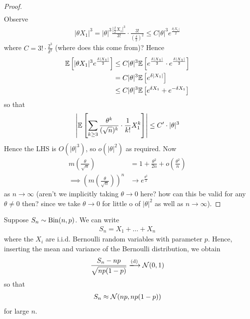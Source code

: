\documentclass{../../template/note}
\begin{document}
\begin{proof}
\begin{align*}
        \end{align*}
        Observe
        \begin{align*}
            |\theta X_1|^3 = |\theta|^3 \frac{\left|\frac{\delta}2 X_1\right|^3}{3!} \cdot \frac{3!}{\left(\frac{\delta}2\right)^2} \leq C|\theta|^3 e^{\frac{\delta|X_1|}{2}}
        \end{align*}
        where \(C = 3! \cdot \frac{2^3}{\delta^3}\) (where does this come from)? Hence
        \begin{align*}
            \mathbb E\left[|\theta X_1|^3 e^{\frac{\delta|X_1|}{2}}\right] &\leq C|\theta|^3 \mathbb E\left[e^{\frac{\delta|X_1|}{2}} \cdot e^{\frac{\delta|X_1|}{2}}\right] \\
            &= C|\theta|^3 \mathbb E\left[e^{\delta|X_1|}\right] \\
            &\leq C|\theta|^3 \mathbb E\left[e^{\delta X_1}+e^{-\delta X_1}\right]
        \end{align*}
        so that
        \begin{align*}
            \left|\mathbb E\left[\sum_{k \geq 3} \frac{\theta^k}{(\sqrt n)^k} \cdot \frac 1{k!} X_1^k\right]\right| \leq C' \cdot |\theta|^3
        \end{align*}
        Hence the LHS is \(O(|\theta|^3)\), so \(o(|\theta|^2)\) as required. Now
        \begin{align*}
            m\left(\frac{\theta}{\sqrt n}\right) &= 1 + \frac{\theta^2}{2n} + o\left(\frac{\theta^2}{n}\right) \\
            \implies \left(m\left(\frac{\theta}{\sqrt n}\right)\right)^n &\to e^{\frac{\theta^2}{2}}
        \end{align*}
        as \(n \to \infty\) (aren't we implicitly taking \(\theta \to 0\) here? how can this be valid for any \(\theta \neq 0\) then? since we take \(\theta \to 0\) for little o of \(|\theta|^2\) as well as \(n \to \infty\)).
    \end{proof}
    
    \begin{example}
        Suppose \(S_n \sim \operatorname{Bin}(n, p)\). We can write
        \begin{align*}
            S_n = X_1 + \dots + X_n
        \end{align*}
        where the \(X_i\) are i.i.d. Bernoulli random variables with parameter \(p\). Hence, inserting the mean and variance of the Bernoulli distribution, we obtain
        \begin{align*}
            \frac{S_n-np}{\sqrt{np(1-p)}} \dto \mc N(0, 1)
        \end{align*}
        so that
        \begin{align*}
            S_n \approx \mathcal{N}(np, np(1-p))
        \end{align*}
        for large \(n\).        
    \end{example}
    
\end{document}
